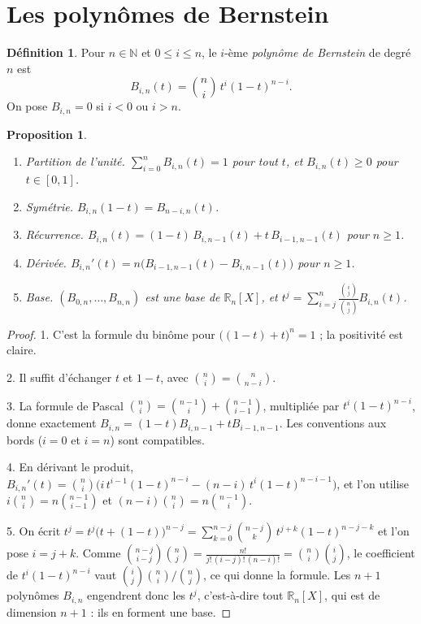 \documentclass[11pt,a4paper]{article}
\theoremstyle{plain}
\newtheorem{proposition}[theoreme]{Proposition}
\theoremstyle{definition}
\newtheorem{definition}[theoreme]{Définition}
\theoremstyle{remark}
\newcommand{\R}{\mathbb{R}}
\begin{document}
\section{Les polynômes de Bernstein}

\begin{definition}
Pour $n\in\mathbb N$ et $0\leq i\leq n$, le $i$-ème \emph{polynôme de Bernstein} de degré $n$ est
\[
  B_{i,n}(t)=\binom ni\,t^i(1-t)^{n-i} .
\]
On pose $B_{i,n}=0$ si $i<0$ ou $i>n$.
\end{definition}

\begin{proposition}\label{prop:bernstein}
\begin{enumerate}[nosep]
\item \emph{Partition de l'unité.} $\sum_{i=0}^nB_{i,n}(t)=1$ pour tout $t$, et $B_{i,n}(t)\geq0$ pour $t\in[0,1]$.
\item \emph{Symétrie.} $B_{i,n}(1-t)=B_{n-i,n}(t)$.
\item \emph{Récurrence.} $B_{i,n}(t)=(1-t)\,B_{i,n-1}(t)+t\,B_{i-1,n-1}(t)$ pour $n\geq1$.
\item \emph{Dérivée.} $B_{i,n}'(t)=n\big(B_{i-1,n-1}(t)-B_{i,n-1}(t)\big)$ pour $n\geq1$.
\item \emph{Base.} $(B_{0,n},\dots,B_{n,n})$ est une base de $\R_n[X]$, et $t^j=\sum_{i=j}^n\frac{\binom ij}{\binom nj}B_{i,n}(t)$.
\end{enumerate}
\end{proposition}

\begin{proof}
1. C'est la formule du binôme pour $\big((1-t)+t\big)^n=1$ ; la positivité est claire.

2. Il suffit d'échanger $t$ et $1-t$, avec $\binom ni=\binom n{n-i}$.

3. La formule de Pascal $\binom ni=\binom{n-1}i+\binom{n-1}{i-1}$, multipliée par $t^i(1-t)^{n-i}$, donne exactement $B_{i,n}=(1-t)B_{i,n-1}+tB_{i-1,n-1}$. Les conventions aux bords ($i=0$ et $i=n$) sont compatibles.

4. En dérivant le produit, $B_{i,n}'(t)=\binom ni\big(i\,t^{i-1}(1-t)^{n-i}-(n-i)\,t^i(1-t)^{n-i-1}\big)$, et l'on utilise $i\binom ni=n\binom{n-1}{i-1}$ et $(n-i)\binom ni=n\binom{n-1}i$.

5. On écrit $t^j=t^j\big(t+(1-t)\big)^{n-j}=\sum_{k=0}^{n-j}\binom{n-j}k\,t^{j+k}(1-t)^{n-j-k}$ et l'on pose $i=j+k$. Comme $\binom{n-j}{i-j}\binom nj=\frac{n!}{j!\,(i-j)!\,(n-i)!}=\binom ni\binom ij$, le coefficient de $t^i(1-t)^{n-i}$ vaut $\binom ij\binom ni/\binom nj$, ce qui donne la formule. Les $n+1$ polynômes $B_{i,n}$ engendrent donc les $t^j$, c'est-à-dire tout $\R_n[X]$, qui est de dimension $n+1$ : ils en forment une base.
\end{proof}
\end{document}
